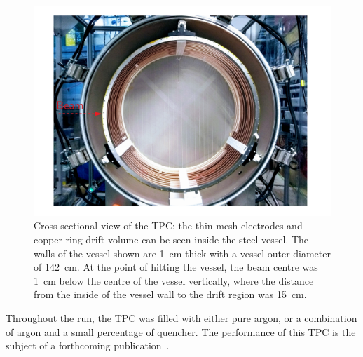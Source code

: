 \begin{figure}
  \centering
  \includegraphics[width=.88\linewidth]{files/Figures/vesselView.pdf}
  \caption{Cross-sectional view of the TPC; the thin mesh electrodes and copper ring drift volume can be seen inside the steel vessel. The walls of the vessel shown are 1~cm thick with a vessel outer diameter of 142~cm. At the point of hitting the vessel, the beam centre was 1~cm below the centre of the vessel vertically, where the distance from the inside of the vessel wall to the drift region was 15~cm.}
   \label{fig:TPC}
\end{figure}

Throughout the run, the TPC was filled with either pure argon, or a combination of argon and a small percentage of quencher.
The performance of this TPC is the subject of a forthcoming publication~\cite{Deisting:2020aaa}.
